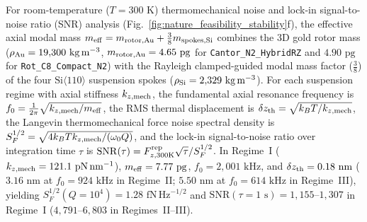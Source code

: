 \documentclass[pdflatex,sn-nature]{sn-jnl}
\DeclareRobustCommand{\roundone}[1]{\fpeval{round(#1,1)}}
\begin{document}
For room-temperature ($T = 300\text{ K}$) thermomechanical noise and lock-in signal-to-noise ratio (SNR) analysis (Fig.~\ref{fig:nature_feasibility_stability}f), the effective axial modal mass $m_{\rm eff} = m_{\rm rotor,Au} + \frac{3}{8}m_{\rm spokes,Si}$ combines the 3D gold rotor mass ($\rho_{\rm Au} = 19{,}300\text{ kg}\,\text{m}^{-3}$, $m_{\rm rotor,Au} = 4.65\text{ pg}$ for \texttt{Cantor\_N2\_HybridRZ} and $4.90\text{ pg}$ for \texttt{Rot\_C8\_Compact\_N2}) with the Rayleigh clamped-guided modal mass factor ($\frac{3}{8}$) of the four $\text{Si}\langle 110\rangle$ suspension spokes ($\rho_{\rm Si} = 2{,}329\text{ kg}\,\text{m}^{-3}$). For each suspension regime with axial stiffness $k_{z,\rm mech}$, the fundamental axial resonance frequency is $f_0 = \frac{1}{2\pi}\sqrt{k_{z,\rm mech}/m_{\rm eff}}$, the RMS thermal displacement is $\delta z_{\rm th} = \sqrt{k_B T / k_{z,\rm mech}}$, the Langevin thermomechanical force noise spectral density is $S_F^{1/2} = \sqrt{4 k_B T k_{z,\rm mech}/(\omega_0 Q)}$, and the lock-in signal-to-noise ratio over integration time $\tau$ is $\mathrm{SNR}(\tau) = F_{z,300\rm K}^{\rm rep}\sqrt{\tau}/S_F^{1/2}$. In Regime~I ($k_{z,\rm mech} = \roundone{\NatureRotCeightCompactNtwoLateralStabilityKZMechPnPerNm}\text{ pN}\,\text{nm}^{-1}$), $m_{\rm eff} = 7.77\text{ pg}$, $f_0 = 2{,}001\text{ kHz}$, and $\delta z_{\rm th} = 0.18\text{ nm}$ ($3.16\text{ nm}$ at $f_0 = 924\text{ kHz}$ in Regime~II; $5.50\text{ nm}$ at $f_0 = 614\text{ kHz}$ in Regime~III), yielding $S_F^{1/2}(Q=10^4) = 1.28\text{ fN}\,\text{Hz}^{-1/2}$ and $\mathrm{SNR}(\tau = 1\text{ s}) = 1{,}155\text{--}1{,}307$ in Regime~I ($4{,}791\text{--}6{,}803$ in Regimes~II--III).
\end{document}
